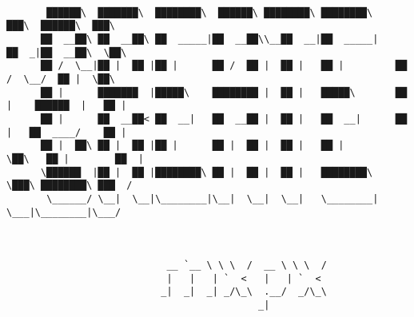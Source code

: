 \documentclass[varwidth=\maxdimen,margin=0.5cm,multi={verbatim}]{standalone}
\begin{document}
\begin{verbatim}

       ██████\  ███████\  ████████\  ██████\ ████████\ ████████\      ███\  ██████\  ███\
      ██  __██\ ██  __██\ ██  _____|██  __██\\__██  __|██  _____|    ██  _|██  __██\  \██\
      ██ /  \__|██ |  ██ |██ |      ██ /  ██ |  ██ |   ██ |         ██  /  \__/  ██ |  \██\
      ██ |      ███████  |█████\    ████████ |  ██ |   █████\       ██ |    ██████  |   ██ |
      ██ |      ██  __██< ██  __|   ██  __██ |  ██ |   ██  __|      ██ |   ██  ____/    ██ |
      ██ |  ██\ ██ |  ██ |██ |      ██ |  ██ |  ██ |   ██ |         \██\   ██ |        ██  |
      \██████  |██ |  ██ |████████\ ██ |  ██ |  ██ |   ████████\     \███\ ████████\ ███  /
       \______/ \__|  \__|\________|\__|  \__|  \__|   \________|      \___|\________|\___/



                            __ `__ \ \ \  /  __ \ \ \  /
                            |   |   | `  <   |   | `  <
                           _|  _|  _| _/\_\  .__/  _/\_\
                                            _|


\end{verbatim}
\end{document}
